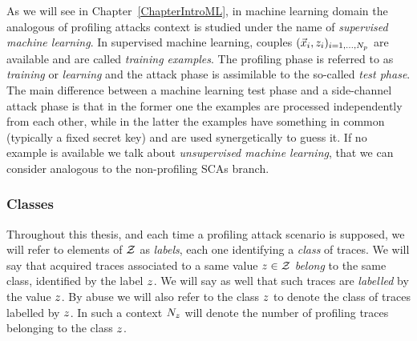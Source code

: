 As we will see in Chapter~\ref{ChapterIntroML}, in machine learning domain the analogous of profiling attacks context is studied under the name of \emph{supervised machine learning}. In supervised machine learning, couples $(\vec{x}_i, z_i)_{i=1, \dots , N_p}$ are available and are called \emph{training examples}. The profiling phase is referred to as \emph{training} or \emph{learning} and the attack phase is assimilable to the so-called \emph{test phase}. The main difference between a machine learning test phase and a side-channel attack phase is that in the former one the examples are processed independently from each other, while in the latter the examples have something in common (typically a fixed secret key) and are used synergetically to guess it. If no example is available we talk about \emph{unsupervised machine learning}, that we can consider analogous to the non-profiling SCAs branch. 

\subsubsection{Classes}
Throughout this thesis, and each time a profiling attack scenario is supposed,  we will refer to elements of $\mathcal{Z}$ as \emph{labels}, each one identifying a \emph{class} of traces. We will say that acquired traces associated to a same value $z\in\mathcal{Z}$ \emph{belong} to the same class, identified by the label $z$. We will say as well that such traces are  \emph{labelled} by the value $z$. By abuse we will also refer to the class $z$ to denote the class of traces labelled by $z$. In such a context $N_{z}$ will denote the number of profiling traces belonging to the class $z$.



